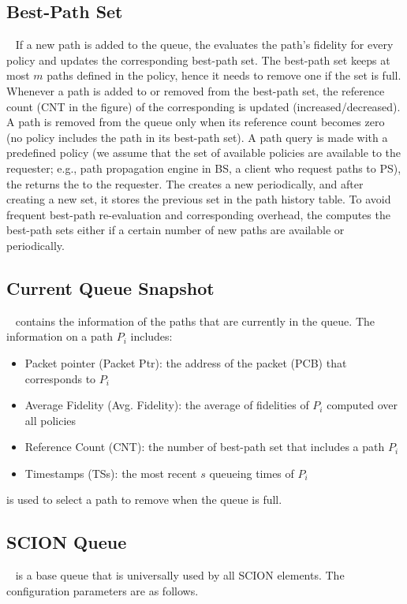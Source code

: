 
\subsection{Best-Path Set}~\label{subsec:bestpath}
If a new path is added to the queue, the \pse evaluates the path's fidelity for every policy and updates the corresponding best-path set. The best-path set keeps at most $m$ paths defined in the policy, hence it needs to remove one if the set is full. Whenever a path is added to or removed from the best-path set, the reference count (CNT in the figure) of the corresponding \qs is updated (increased/decreased). A path is removed from the queue only when its reference count becomes zero (no policy includes the path in its best-path set).
A path query is made with a predefined policy (we assume that the set of available policies are available to the requester; e.g., path propagation engine in BS, a client who request paths to PS), the \pse returns the \bps to the requester. The \pse creates a new \bps periodically, and after creating a new set, it stores the previous set in the path history table.
To avoid frequent best-path re-evaluation and corresponding overhead, the \pse computes the best-path sets either if a certain number of new paths are available or periodically.

\subsection{Current Queue Snapshot}~\label{subsec:queue-snapshot}
\QS contains the information of the paths that are currently in the queue. The information on a path $P_i$ includes:
\begin{itemize}
\item{Packet pointer (Packet Ptr): } the address of the packet (PCB) that corresponds to $P_i$
\item{Average Fidelity (Avg. Fidelity): } the average of fidelities of $P_i$ computed over all policies
\item{Reference Count (CNT): } the number of best-path set that includes a path $P_i$
\item{Timestamps (TSs): } the most recent $s$ queueing times of $P_i$
\end{itemize}
\QS is used to select a path to remove when the queue is full.

\subsection{SCION Queue}~\label{subsec:scion-queue}
\SQ is a base queue that is universally used by all SCION elements. The configuration parameters are as follows.

